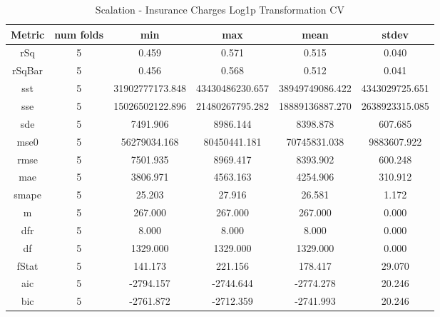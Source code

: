 \documentclass{article}
\begin{document}
\begin{table}[H]
\centering
\caption{Scalation - Insurance Charges Log1p Transformation CV}
\label{tab:Scalation - Insurance Charges Log1p Transformation CV}
\begin{tabular}{|c|c|c|c|c|c|}\hline
Metric & num folds & min & max & mean & stdev \\ \hline \hline
rSq & 5 & 0.459 & 0.571 & 0.515 & 0.040 \\ \hline
rSqBar & 5 & 0.456 & 0.568 & 0.512 & 0.041 \\ \hline
sst & 5 & 31902777173.848 & 43430486230.657 & 38949749086.422 & 4343029725.651 \\ \hline
sse & 5 & 15026502122.896 & 21480267795.282 & 18889136887.270 & 2638923315.085 \\ \hline
sde & 5 & 7491.906 & 8986.144 & 8398.878 & 607.685 \\ \hline
mse0 & 5 & 56279034.168 & 80450441.181 & 70745831.038 & 9883607.922 \\ \hline
rmse & 5 & 7501.935 & 8969.417 & 8393.902 & 600.248 \\ \hline
mae & 5 & 3806.971 & 4563.163 & 4254.906 & 310.912 \\ \hline
smape & 5 & 25.203 & 27.916 & 26.581 & 1.172 \\ \hline
m & 5 & 267.000 & 267.000 & 267.000 & 0.000 \\ \hline
dfr & 5 & 8.000 & 8.000 & 8.000 & 0.000 \\ \hline
df & 5 & 1329.000 & 1329.000 & 1329.000 & 0.000 \\ \hline
fStat & 5 & 141.173 & 221.156 & 178.417 & 29.070 \\ \hline
aic & 5 & -2794.157 & -2744.644 & -2774.278 & 20.246 \\ \hline
bic & 5 & -2761.872 & -2712.359 & -2741.993 & 20.246 \\ \hline
\end{tabular}
\end{table}
\end{document}
